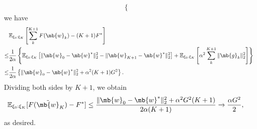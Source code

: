 \begin{exercise}
\begin{enumerate}
\begin{solution}
\begin{enumerate}
\begin{align*}
\begin{cases}
                            \end{cases}
                        \end{align*}
                        we have
                        \begin{align*}
                                & \mathbb{E}_{\xi_0:\xi_{K}}\left[\sum_k^{K+1}F(\mb{w}_k)-(K+1)F^*\right]                                                                                                                                          \\
                            \le & \frac{1}{2\alpha}\left\{\mathbb{E}_{\xi_0:\xi_{K}}\left[\|\mb{w}_0-\mb{w}^*\|_2^2 - \|\mb{w}_{K+1}-\mb{w}^*\|_2^2\right]  + \mathbb{E}_{\xi_0:\xi_{K}}\left[\alpha^2 \sum_k^{K+1}\|\mb{g}_k\|_2^2\right]\right\} \\
                            \le & \frac{1}{2\alpha}\left\{\|\mb{w}_0-\mb{w}^*\|_2^2 + \alpha^2 (K+1) G^2\right\}.
                        \end{align*}
                        Dividing both sides by $K+1$, we obtain
                        \begin{align*}
                            \mathbb{E}_{\xi_0:\xi_K}[F(\tilde{\mb{w}}_K)-F^*] & \leq \frac{\|\mb{w}_0-\mb{w}^*\|_2^2 + \alpha^2 G^2 (K+1)}{2\alpha (K+1)}\xrightarrow[]{}\frac{\alpha G^2}{2},
                        \end{align*}
                        as desired.
                        \qedhere
                \end{enumerate}
            \end{solution}

    \end{enumerate}


\end{exercise}
\clearpage



